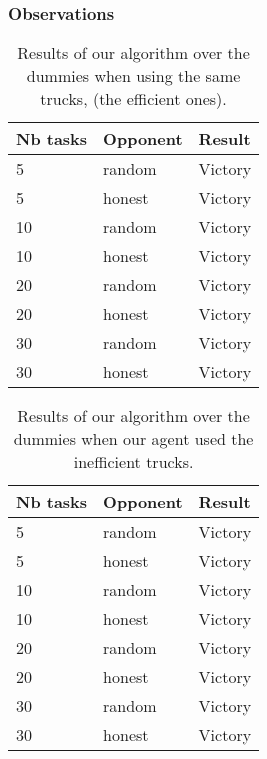 \documentclass[11pt]{article}
\begin{document}
\subsubsection{Observations}
\begin{table}
  \begin{center}
    \begin{tabular}{ | l | l | l | }
    \hline
    Nb tasks & Opponent & Result   \\ \hline
    5 & random & Victory \\ \hline
    5 & honest & Victory \\ \hline
    10 & random & Victory \\ \hline
    10 & honest & Victory \\ \hline
    20 & random & Victory \\ \hline
    20 & honest & Victory \\ \hline
    30 & random & Victory \\ \hline
    30 & honest & Victory \\ \hline

    
    \end{tabular}
    \caption{Results of our algorithm over the dummies when using the same trucks, (the efficient ones).}
    \label{tab:1}
\end{center}
\end{table}

\begin{table}
  \begin{center}
    \begin{tabular}{ | l | l | l | }
    \hline
    Nb tasks & Opponent & Result   \\ \hline
    5 & random & Victory \\ \hline
    5 & honest & Victory \\ \hline
    10 & random & Victory \\ \hline
    10 & honest & Victory \\ \hline
    20 & random & Victory \\ \hline
    20 & honest & Victory \\ \hline
    30 & random & Victory \\ \hline
    30 & honest & Victory \\ \hline
    
    \end{tabular}
    \caption{Results of our algorithm over the dummies when our agent used the inefficient trucks.}
    \label{tab:2}
\end{center}
\end{table}
\end{document}
